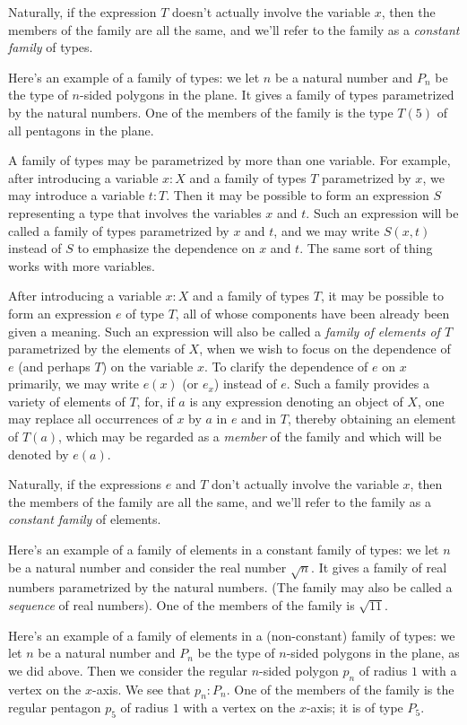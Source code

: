 Naturally, if the expression $T$ doesn't actually involve the variable $x$, then the members of the family are all the same,
and we'll refer to the family as a \emph{constant family} of types.

Here's an example of a family of types: we let $n$ be a natural number and $P_n$ be the type of $n$-sided polygons in the plane.  It gives a family
of types parametrized by the natural numbers.  One of the members of the family is the type $T(5)$ of all pentagons in the plane.

A family of types may be parametrized by more than one variable.  For example, after introducing a variable $x:X$ and a family of types $T$
parametrized by $x$, we may introduce a variable $t:T$.  Then it may be possible to form an expression $S$ representing a type that involves the
variables $x$ and $t$.  Such an expression will be called a family of types parametrized by $x$ and $t$, and we may write $S(x,t)$ instead of
$S$ to emphasize the dependence on $x$ and $t$.  The same sort of thing works with more variables. 

After introducing a variable $x:X$ and a family of types $T$, it may be possible to form an expression $e$ of type $T$, all of whose components have been already been
given a meaning.
Such an expression will also be called a \emph{family of elements of $T$}  parametrized by the elements of $X$, when
we wish to focus on the dependence of $e$ (and perhaps $T$) on the variable $x$.
To clarify the dependence of $e$ on $x$ primarily, we may write $e(x)$ (or $e_x$) instead of $e$.
Such a family provides a variety of elements of $T$, for, if $a$ is any expression denoting an object of $X$, one may replace all
occurrences of $x$ by $a$ in $e$ and in $T$, thereby obtaining an element of $T(a)$, which may be regarded as a \emph{member} of the family
and which will be denoted by $e(a)$.

Naturally, if the expressions $e$ and $T$ don't actually involve the variable $x$, then the members of the family are all the same,
and we'll refer to the family as a \emph{constant family} of elements.

Here's an example of a family of elements in a constant family of types: we let $n$ be a natural number and consider the real number $\sqrt n$.
It gives a family of real numbers parametrized by the natural numbers.
(The family may also be called a \emph{sequence} of real numbers).
One of the members of the family is $\sqrt{11}$.

Here's an example of a family of elements in a (non-constant) family of types: we let $n$ be a natural number and $P_n$ be the type of $n$-sided
polygons in the plane, as we did above.  Then we consider the regular $n$-sided polygon $p_n$ of radius $1$ with a vertex on the $x$-axis.  We
see that $p_n : P_n$.  One of the members of the family is the regular pentagon $p_5$ of radius $1$ with a vertex on the $x$-axis; it is of type
$P_5$.

